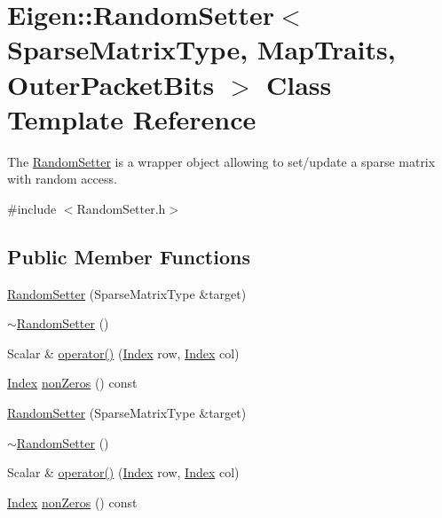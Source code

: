 \hypertarget{class_eigen_1_1_random_setter}{}\section{Eigen\+:\+:Random\+Setter$<$ Sparse\+Matrix\+Type, Map\+Traits, Outer\+Packet\+Bits $>$ Class Template Reference}
\label{class_eigen_1_1_random_setter}


The \hyperlink{class_eigen_1_1_random_setter}{Random\+Setter} is a wrapper object allowing to set/update a sparse matrix with random access.  




{\ttfamily \#include $<$Random\+Setter.\+h$>$}

\subsection*{Public Member Functions}
\begin{DoxyCompactItemize}
\item 
\hyperlink{class_eigen_1_1_random_setter_a62e960bd52cec62a59ebb285f381138f}{Random\+Setter} (Sparse\+Matrix\+Type \&target)
\item 
\hyperlink{class_eigen_1_1_random_setter_a3e4a78672df59ab4dd2799919b431027}{$\sim$\+Random\+Setter} ()
\item 
Scalar \& \hyperlink{class_eigen_1_1_random_setter_a77dcbbc964b42027e00af269a5147c68}{operator()} (\hyperlink{namespace_eigen_a62e77e0933482dafde8fe197d9a2cfde}{Index} row, \hyperlink{namespace_eigen_a62e77e0933482dafde8fe197d9a2cfde}{Index} col)
\item 
\hyperlink{namespace_eigen_a62e77e0933482dafde8fe197d9a2cfde}{Index} \hyperlink{class_eigen_1_1_random_setter_ac34e5cd67e370641c3b48c8a91705046}{non\+Zeros} () const
\item 
\hyperlink{class_eigen_1_1_random_setter_a62e960bd52cec62a59ebb285f381138f}{Random\+Setter} (Sparse\+Matrix\+Type \&target)
\item 
\hyperlink{class_eigen_1_1_random_setter_a3e4a78672df59ab4dd2799919b431027}{$\sim$\+Random\+Setter} ()
\item 
Scalar \& \hyperlink{class_eigen_1_1_random_setter_a77dcbbc964b42027e00af269a5147c68}{operator()} (\hyperlink{namespace_eigen_a62e77e0933482dafde8fe197d9a2cfde}{Index} row, \hyperlink{namespace_eigen_a62e77e0933482dafde8fe197d9a2cfde}{Index} col)
\item 
\hyperlink{namespace_eigen_a62e77e0933482dafde8fe197d9a2cfde}{Index} \hyperlink{class_eigen_1_1_random_setter_ac34e5cd67e370641c3b48c8a91705046}{non\+Zeros} () const
\end{DoxyCompactItemize}
